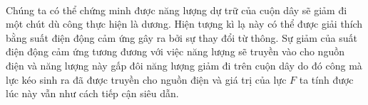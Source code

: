 \begin{loigiai}
\begin{itemize}
\begin{itemize}
            \\Chúng ta có thể chứng minh được năng lượng dự trữ của cuộn dây sẽ giảm đi một chút dù công thực hiện là dương. Hiện tượng kì lạ này có thể được giải thích bằng suất điện động cảm ứng gây ra bởi sự thay đổi từ thông. Sự giảm của suất điện động cảm ứng tương đương với việc năng lượng sẽ truyền vào cho nguồn điện và năng lượng này gấp đôi năng lượng giảm đi trên cuộn dây do đó công mà lực kéo sinh ra đã được truyền cho nguồn điện và giá trị của lực $F$ ta tính được lúc này vẫn như cách tiếp cận siêu dẫn.
        \end{itemize}

        
    \end{itemize}

\end{loigiai}

